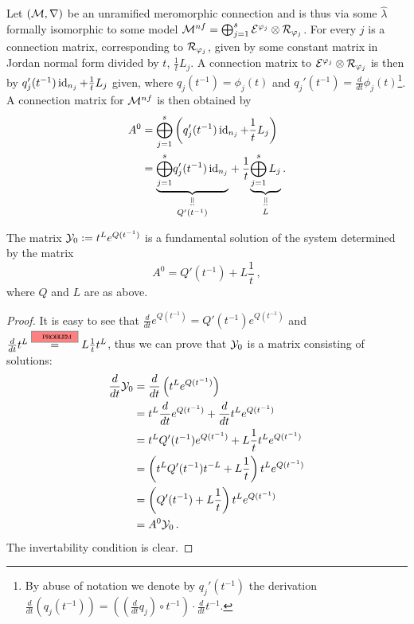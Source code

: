 Let $(\mathcal{M},\nabla)$ be an unramified meromorphic connection and is thus via some
$\hat\lambda$ formally isomorphic to some model
$\mathcal{M}^{nf}=\bigoplus_{j=1}^s\mathcal{E}^{\varphi_j}\otimes\mathcal{R}_{\varphi_j}$.
For every $j$ is a connection matrix, corresponding to $\mathcal{R}_{\varphi_j}$, given
by some constant matrix in Jordan normal form divided by $t$, $\frac{1}{t}L_j$.
A connection matrix to $\mathcal{E}^{\varphi_j}\otimes\mathcal{R}_{\varphi_j}$ is then by
$q_j'(t^{-1})\operatorname{id}_{n_j}+\frac{1}{t}L_j$ given, where
$q_j(t^{-1})=\phi_j(t)$ and $q_j'(t^{-1})=\frac{d}{dt}\phi_j(t)$\footnote{By
abuse of notation we denote by $q_j'(t^{-1})$ the derivation
$\frac{d}{dt}(q_j(t^{-1}))=\left(\left(\frac{d}{dt}q_j\right)\circ t^{-1}\right)
\cdot\frac{d}{dt}t^{-1}$.}.
A connection matrix for $\mathcal{M}^{nf}$ is then obtained by
\begin{align*}
  A^0&= \bigoplus_{j=1}^s
  \left(q_j'(t^{-1})\id_{n_j}+\frac{1}{t}L_j\right)
  \\&= \underset{Q'(t^{-1})}{%
    \underset{\text{\rotatebox[origin=c]{-90}{$=:$}}}{\underbrace{%
    \underset{j=1}{\overset{s}{\bigoplus}}q_j'(t^{-1})\id_{n_j}}}}
    +\frac{1}{t}\underset{L}{%
    \underset{\text{\rotatebox[origin=c]{-90}{$=:$}}}{\underbrace{%
    \bigoplus_{j=1}^sL_j}}}
    \,.
\end{align*}
\begin{prop}\label{prop:fundSolBuilder}
  The matrix $\mathcal{Y}_0:=t^L e^{Q(t^{-1})}$ is a fundamental solution
  of the system determined by the matrix
  \[
    A^0=Q'(t^{-1})+L\frac{1}{t} \,,
  \]
  where $Q$ and $L$ are as above.
\end{prop}
\begin{proof}
  It is easy to see that $\frac{d}{dt}e^{Q(t^{-1})}=Q'(t^{-1})e^{Q(t^{-1})}$
  and $\frac{d}{dt}t^L\overset{\PROBLEM}{=}L\frac{1}{t}t^L$, thus we can prove
  that $\mathcal{Y}_0$ is a matrix consisting of solutions:
  \begin{align*}
    \frac{d}{dt}\mathcal{Y}_0
    &=\frac{d}{dt}\left(t^Le^{Q(t^{-1})}\right)
  \\&= t^L\frac{d}{dt}e^{Q(t^{-1})} + \frac{d}{dt}t^Le^{Q(t^{-1})}
  \\&= t^LQ'(t^{-1})e^{Q(t^{-1})} + L\frac{1}{t}t^Le^{Q(t^{-1})}
  \\&=\left(t^LQ'(t^{-1})t^{-L}+L\frac{1}{t}\right)t^Le^{Q(t^{-1})}
  \\&=\left(Q'(t^{-1})+L\frac{1}{t}\right)t^Le^{Q(t^{-1})}
  \\&=A^0\mathcal{Y}_0 \,.
  \end{align*}
  The invertability condition is clear.
\end{proof}
